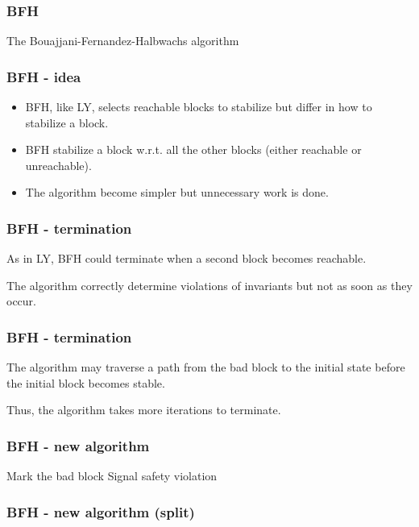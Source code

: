 \documentclass[11pt,handout]{beamer}
\begin{document}
\begin{frame}
  \frametitle{BFH}
  The Bouajjani-Fernandez-Halbwachs algorithm
\end{frame}

\begin{frame}
  \frametitle{BFH - idea}
  \begin{itemize}
  \item BFH, like LY, selects reachable blocks to stabilize but differ in how to
    stabilize a block.
  \item BFH stabilize a block w.r.t. all the other blocks (either reachable or
    unreachable).
  \item The algorithm become simpler but unnecessary work is done.
  \end{itemize} 
\end{frame}

\begin{frame}
  \frametitle{BFH - termination}
  As in LY, BFH could terminate when a second block becomes reachable.
  
  The algorithm correctly determine violations of invariants but not as soon as
  they occur.
\end{frame}

\begin{frame}
  \frametitle{BFH - termination}
  The algorithm may traverse a path from the bad block to the initial state
  before the initial block becomes stable.

  Thus, the algorithm takes more iterations to terminate.
\end{frame}

\begin{frame}[fragile]
  \frametitle{BFH - new algorithm}
  \begin{algorithmic}[1]
    \State Mark the bad block
    \Else
    \EndIf
    \EndWhile
    \State Signal safety violation
    \EndIf
  \end{algorithmic}
\end{frame}

\begin{frame}[fragile]
  \frametitle{BFH - new algorithm (split)}
  \begin{algorithmic}[1]
    \Else
    \EndIf
    \EndFor
    \EndFor
    \EndFunction
  \end{algorithmic}
\end{frame}
\end{document}
